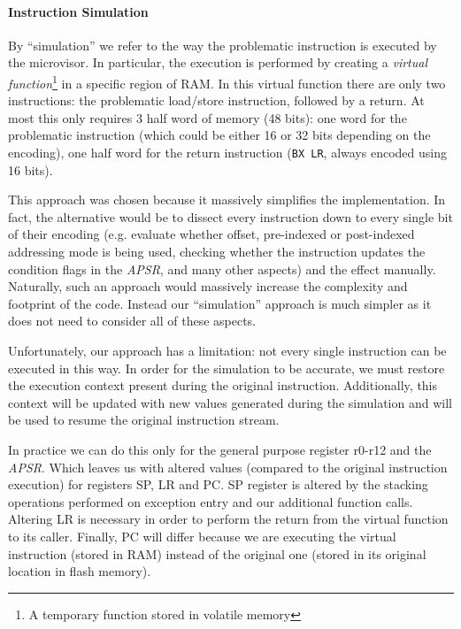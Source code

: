 \documentclass{article}
\begin{document}
\paragraph{Instruction Simulation}
By ``simulation'' we refer to the way the problematic instruction is executed by the microvisor. In particular, the execution is performed by creating a \textit{virtual function}\footnote{A temporary function stored in volatile memory} in a specific region of RAM. In this virtual function there are only two instructions: the problematic load/store instruction, followed by a return. At most this only requires 3 half word of memory (48 bits): one word for the problematic instruction (which could be either 16 or 32 bits depending on the encoding), one half word for the return instruction (\verb|BX LR|, always encoded using 16 bits).

This approach was chosen because it massively simplifies the implementation. In fact, the alternative would be to dissect every instruction down to every single bit of their encoding (e.g. evaluate whether offset, pre-indexed or post-indexed addressing mode is being used, checking whether the instruction updates the condition flags in the \textit{APSR}, and many other aspects) and the effect manually. Naturally, such an approach would massively increase the complexity and footprint of the code. Instead our ``simulation'' approach is much simpler as it does not need to consider all of these aspects.

Unfortunately, our approach has a limitation: not every single instruction can be executed in this way. 
In order for the simulation to be accurate, we must restore the execution context present during the original instruction. Additionally, this context will be updated with new values generated during the simulation and will be used to resume the original instruction stream.

In practice we can do this only for the general purpose register r0-r12 and the \textit{APSR}. Which leaves us with altered values (compared to the original instruction execution) for registers SP, LR and PC. SP register is altered by the stacking operations performed on exception entry and our additional function calls. Altering LR is necessary in order to perform the return from the virtual function to its caller. Finally, PC will differ because we are executing the virtual instruction (stored in RAM) instead of the original one (stored in its original location in flash memory).
\end{document}
